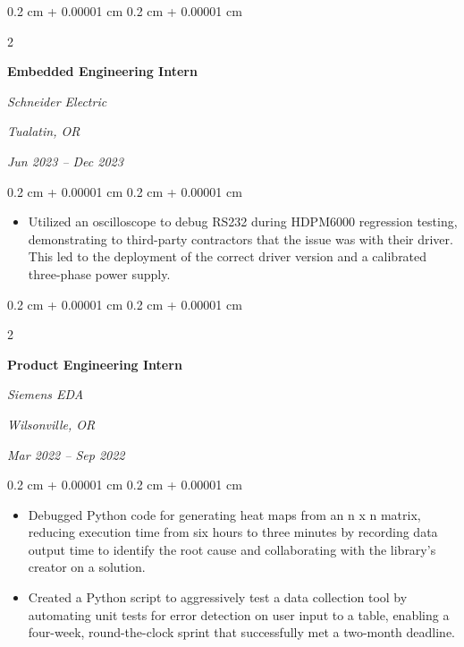 \documentclass[10pt, letterpaper]{article}
\newenvironment{highlights}{
    \begin{itemize}[
        topsep=0.10 cm,
        parsep=0.10 cm,
        partopsep=0pt,
        itemsep=0pt,
        leftmargin=0.4 cm + 10pt
    ]
}{
    \end{itemize}
} %
\newenvironment{onecolentry}{
    \begin{adjustwidth}{
        0.2 cm + 0.00001 cm
    }{
        0.2 cm + 0.00001 cm
    }
}{
    \end{adjustwidth}
} %
\newenvironment{twocolentry}[2][]{
    \onecolentry
    \def\secondColumn{#2}
    \setcolumnwidth{\fill, 4.5 cm}
    \begin{paracol}{2}
}{
    \switchcolumn \raggedleft \secondColumn
    \end{paracol}
    \endonecolentry
} %
\begin{document}
        \vspace{0.2 cm}

        \begin{twocolentry}{
        \textit{Tualatin, OR}    
            
        \textit{Jun 2023 – Dec 2023}}
            \textbf{Embedded Engineering Intern}
            
            \textit{Schneider Electric}
        \end{twocolentry}

        \vspace{0.10 cm}
        \begin{onecolentry}
            \begin{highlights} 
                \item Utilized an oscilloscope to debug RS232 during HDPM6000 regression testing, demonstrating to third-party contractors that the issue was with their driver. This led to the deployment of the correct driver version and a calibrated three-phase power supply.
            \end{highlights}
        \end{onecolentry}

        \vspace{0.2 cm}

        \begin{twocolentry}{
        \textit{Wilsonville, OR}    
            
        \textit{Mar 2022 – Sep 2022}}
            \textbf{Product Engineering Intern}
            
            \textit{Siemens EDA}
        \end{twocolentry}

        \vspace{0.10 cm}
        \begin{onecolentry}
            \begin{highlights}
                \item Debugged Python code for generating heat maps from an n x n matrix, reducing execution time from six hours to three minutes by recording data output time to identify the root cause and collaborating with the library's creator on a solution.
                \item Created a Python script to aggressively test a data collection tool by automating unit tests for error detection on user input to a table, enabling a four-week, round-the-clock sprint that successfully met a two-month deadline.
            \end{highlights}
        \end{onecolentry}
\end{document}

